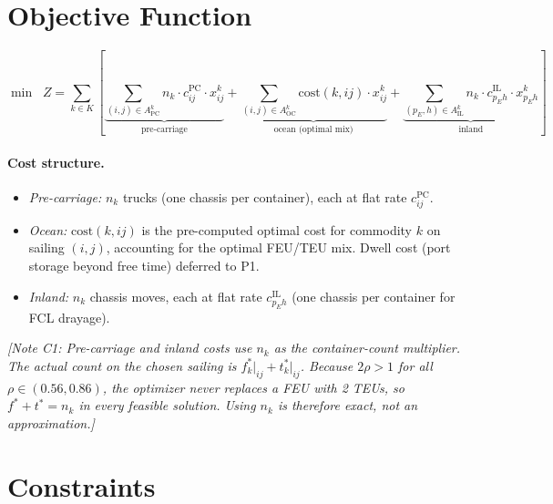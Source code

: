 \documentclass[11pt,a4paper]{article}
\theoremstyle{definition}
\begin{document}
\section{Objective Function}

\begin{equation}
  \min \;\; Z = \sum_{k \in K} \left[
    \underbrace{\sum_{(i,j) \in A^k_{\text{PC}}} n_k \cdot c_{ij}^{\text{PC}} \cdot x_{ij}^k}_{\text{pre-carriage}}
    +
    \underbrace{\sum_{(i,j) \in A^k_{\text{OC}}} \text{cost}(k,ij) \cdot x_{ij}^k}_{\text{ocean (optimal mix)}}
    +
    \underbrace{\sum_{(p_E,h) \in A^k_{\text{IL}}} n_k \cdot c_{p_E h}^{\text{IL}} \cdot x_{p_E h}^k}_{\text{inland}}
  \right]
  \label{eq:obj}
\end{equation}

\paragraph{Cost structure.}
\begin{itemize}[noitemsep]
  \item \textit{Pre-carriage:} $n_k$ trucks (one chassis per container), each at flat rate $c_{ij}^{\text{PC}}$.
  \item \textit{Ocean:} $\text{cost}(k,ij)$ is the pre-computed optimal cost for commodity $k$ on sailing $(i,j)$,
        accounting for the optimal FEU/TEU mix. Dwell cost (port storage beyond free time) deferred to P1.
  \item \textit{Inland:} $n_k$ chassis moves, each at flat rate $c_{p_E h}^{\text{IL}}$ (one chassis per container for FCL drayage).
\end{itemize}

\textit{[Note C1: Pre-carriage and inland costs use $n_k$ as the container-count multiplier. The actual count on the chosen sailing is $f_k^*\big|_{ij} + t_k^*\big|_{ij}$. Because $2\rho > 1$ for all $\rho \in (0.56, 0.86)$, the optimizer never replaces a FEU with 2 TEUs, so $f^*+t^* = n_k$ in every feasible solution. Using $n_k$ is therefore exact, not an approximation.]}

\section{Constraints}
\end{document}
